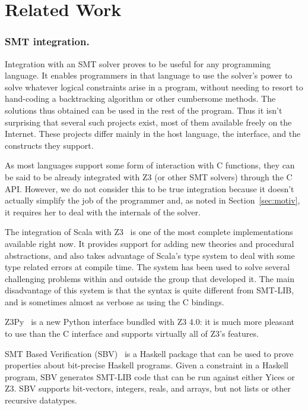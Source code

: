 \section{Related Work}

\subsubsection{SMT integration.}

Integration with an SMT solver proves to be useful for any programming
language. It enables programmers in that language to use the solver's power to
solve whatever logical constraints arise in a program, without needing to
resort to hand-coding a backtracking algorithm or other cumbersome methods.
The solutions thus obtained can be used in the rest of the program.
Thus it isn't surprising that several such projects exist, most of them
available freely on the Internet. These projects differ mainly in the host
language, the interface, and the constructs they support.

As most languages support some form of interaction with C functions, they can
be said to be already integrated with Z3 (or other SMT solvers) through the C
API. However, we do not consider this to be true integration because it
doesn't actually simplify the job of the programmer and, as noted in
Section~\ref{sec:motiv}, it requires her to deal with the internals of the
solver.

The integration of Scala with Z3~\cite{scalaz3} is one of the most complete
implementations available right now. It provides support for adding new
theories and procedural abstractions, and also takes advantage of Scala's type
system to deal with some type related errors at compile time.  The system has
been used to solve several challenging problems within and outside the group
that developed it. The main disadvantage of this system is that the syntax is
quite different from SMT-LIB, and is sometimes almost as verbose as using the
C bindings.

Z3Py~\cite{z3py} is a new Python interface bundled with Z3 4.0: it is much
more pleasant to use than the C interface and supports virtually all of Z3's
features.

SMT Based Verification (SBV)~\cite{sbv} is a Haskell package that can be used
to prove properties about bit-precise Haskell programs. Given a constraint in
a Haskell program, SBV generates SMT-LIB code that can be run against either
Yices or Z3. SBV supports bit-vectors, integers, reals, and arrays, but not
lists or other recursive datatypes.

